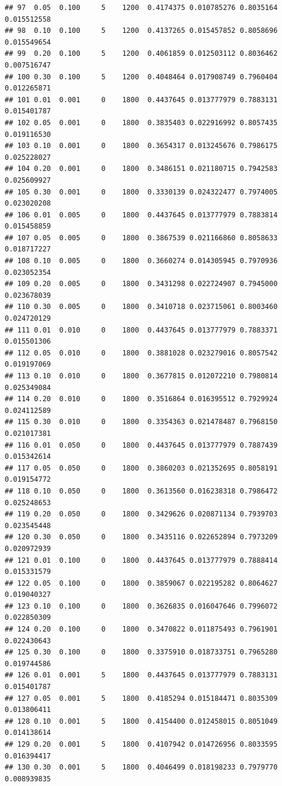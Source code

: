\documentclass[
]{article}
\begin{document}
\begin{verbatim}
## 97  0.05  0.100     5    1200  0.4174375 0.010785276 0.8035164 0.015512558
## 98  0.10  0.100     5    1200  0.4137265 0.015457852 0.8058696 0.015549654
## 99  0.20  0.100     5    1200  0.4061859 0.012503112 0.8036462 0.007516747
## 100 0.30  0.100     5    1200  0.4048464 0.017908749 0.7960404 0.012265871
## 101 0.01  0.001     0    1800  0.4437645 0.013777979 0.7883131 0.015401787
## 102 0.05  0.001     0    1800  0.3835403 0.022916992 0.8057435 0.019116530
## 103 0.10  0.001     0    1800  0.3654317 0.013245676 0.7986175 0.025228027
## 104 0.20  0.001     0    1800  0.3486151 0.021180715 0.7942583 0.025609927
## 105 0.30  0.001     0    1800  0.3330139 0.024322477 0.7974005 0.023020208
## 106 0.01  0.005     0    1800  0.4437645 0.013777979 0.7883814 0.015458859
## 107 0.05  0.005     0    1800  0.3867539 0.021166860 0.8058633 0.018717227
## 108 0.10  0.005     0    1800  0.3660274 0.014305945 0.7970936 0.023052354
## 109 0.20  0.005     0    1800  0.3431298 0.022724907 0.7945000 0.023678039
## 110 0.30  0.005     0    1800  0.3410718 0.023715061 0.8003460 0.024720129
## 111 0.01  0.010     0    1800  0.4437645 0.013777979 0.7883371 0.015501306
## 112 0.05  0.010     0    1800  0.3881028 0.023279016 0.8057542 0.019197069
## 113 0.10  0.010     0    1800  0.3677815 0.012072210 0.7980814 0.025349084
## 114 0.20  0.010     0    1800  0.3516864 0.016395512 0.7929924 0.024112589
## 115 0.30  0.010     0    1800  0.3354363 0.021478487 0.7968150 0.021017381
## 116 0.01  0.050     0    1800  0.4437645 0.013777979 0.7887439 0.015342614
## 117 0.05  0.050     0    1800  0.3860203 0.021352695 0.8058191 0.019154772
## 118 0.10  0.050     0    1800  0.3613560 0.016238318 0.7986472 0.025248653
## 119 0.20  0.050     0    1800  0.3429626 0.020871134 0.7939703 0.023545448
## 120 0.30  0.050     0    1800  0.3435116 0.022652894 0.7973209 0.020972939
## 121 0.01  0.100     0    1800  0.4437645 0.013777979 0.7888414 0.015331579
## 122 0.05  0.100     0    1800  0.3859067 0.022195282 0.8064627 0.019040327
## 123 0.10  0.100     0    1800  0.3626835 0.016047646 0.7996072 0.022850309
## 124 0.20  0.100     0    1800  0.3470822 0.011875493 0.7961901 0.022430643
## 125 0.30  0.100     0    1800  0.3375910 0.018733751 0.7965280 0.019744586
## 126 0.01  0.001     5    1800  0.4437645 0.013777979 0.7883131 0.015401787
## 127 0.05  0.001     5    1800  0.4185294 0.015184471 0.8035309 0.013806411
## 128 0.10  0.001     5    1800  0.4154400 0.012458015 0.8051049 0.014138614
## 129 0.20  0.001     5    1800  0.4107942 0.014726956 0.8033595 0.016394417
## 130 0.30  0.001     5    1800  0.4046499 0.018198233 0.7979770 0.008939835

\end{verbatim}
\end{document}
